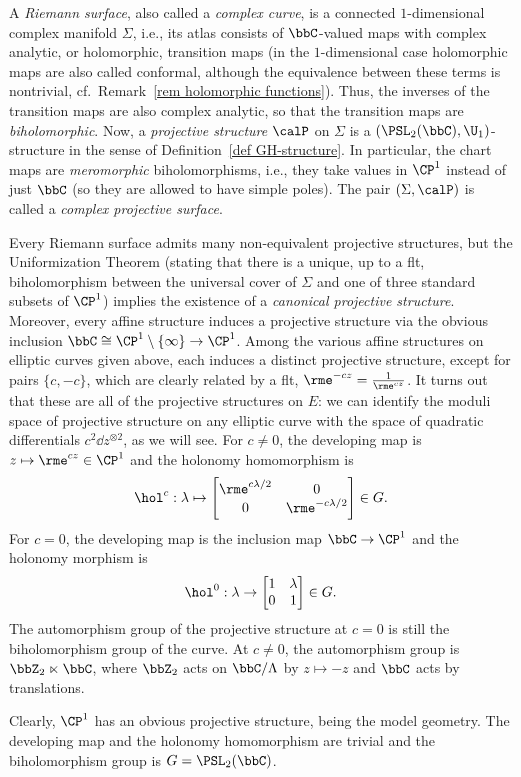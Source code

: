 \begin{example}\label{ex projective structure}
    A \emph{Riemann surface}, also called a \emph{complex curve}, is a connected $1$-dimensional complex manifold $\Sigma$, i.e., its atlas consists of $\bbC$-valued maps with complex analytic, or holomorphic, transition maps (in the $1$-dimensional case holomorphic maps are also called conformal, although the equivalence between these terms is nontrivial, cf.\ Remark~\ref{rem holomorphic functions}). Thus, the inverses of the transition maps are also complex analytic, so that the transition maps are \emph{biholomorphic}. Now, a \emph{projective structure} $\calP$ on $\Sigma$ is a $(\PSL_2(\bbC),\U_1)$-structure in the sense of Definition\ \ref{def GH-structure}. In particular, the chart maps are \emph{meromorphic} biholomorphisms, i.e., they take values in $\CP^1$ instead of just $\bbC$ (so they are allowed to have simple poles). The pair $(\Sigma,\calP)$ is called a \emph{complex projective surface}.
    
    Every Riemann surface admits many non-equivalent projective structures, but the Uniformization Theorem (stating that there is a unique, up to a \gls{flt}, biholomorphism between the universal cover of $\Sigma$ and one of three standard subsets of $\CP^1$) implies the existence of a \emph{canonical projective structure}.
    Moreover, every affine structure induces a projective structure via the obvious inclusion $\bbC\cong \CP^1\setminus \{\infty\}\to \CP^1$. Among the various affine structures on elliptic curves given above, each induces a distinct projective structure, except for pairs $\{c,-c\}$, which are clearly related by a \gls{flt}, $\rme^{-cz}=\frac{1}{\rme^{cz}}$. It turns out that these are all of the projective structures on $E$: we can identify the moduli space of projective structure on any elliptic curve with the space of quadratic differentials $c^2\dd z^{\otimes 2}$, as we will see. For $c\neq 0$, the developing map is $z\mapsto \rme^{cz}\in \CP^1$ and the holonomy homomorphism is 
    \[\hol^c:\lambda \mapsto \begin{bmatrix}
        \rme^{c\lambda/2} & 0\\
        0 & \rme^{-c\lambda/2}
    \end{bmatrix}\in G.\]
    For $c=0$, the developing map is the inclusion map $\bbC\to \CP^1$ and the holonomy morphism is 
    \[\hol^0:\lambda\to \begin{bmatrix}
        1 & \lambda \\ 0 & 1
    \end{bmatrix}\in G.\]
    The automorphism group of the projective structure at $c=0$ is still the biholomorphism group of the curve. At $c\neq 0$, the automorphism group is $\bbZ_2\ltimes\bbC$, where $\bbZ_2$ acts on $\bbC\slash\Lambda$ by $z\mapsto -z$ and $\bbC$ acts by translations.

    Clearly, $\CP^1$ has an obvious projective structure, being the model geometry. The developing map and the holonomy homomorphism are trivial and the biholomorphism group is $G=\PSL_2(\bbC)$.
\end{example}


